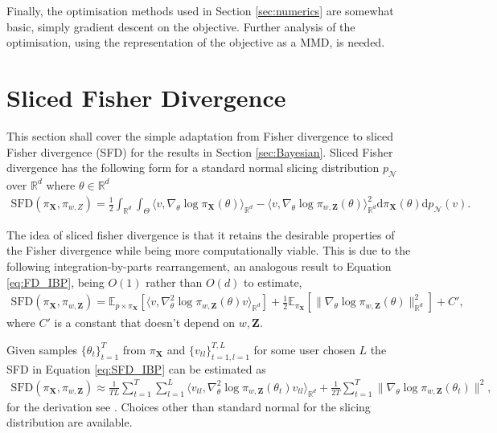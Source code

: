 \documentclass[hyperref]{article}
\theoremstyle{plain}
\theoremstyle{remark}
\newcommand{\bX}{\mathbf{X}}
\newcommand{\bZ}{\mathbf{Z}}
\newcommand{\bbR}{\mathbb{R}}
\newcommand{\bbE}{\mathbb{E}}
\begin{document}
Finally, the optimisation methods used in Section \ref{sec:numerics} are somewhat basic, simply gradient descent on the objective. Further analysis of the optimisation, using the representation of the objective as a MMD, is needed. 



\newpage
\appendix
\onecolumn
\section{Sliced Fisher Divergence}
This section shall cover the simple adaptation from Fisher divergence to sliced Fisher divergence (SFD) \citep{song2019sliced} for the results in Section \ref{sec:Bayesian}. Sliced Fisher divergence has the following form for a standard normal slicing distribution $p_{\mathcal{N}}$ over $\bbR^{d}$ where $\theta\in\bbR^{d}$
\begin{align}\label{eq:SFD}
	\text{SFD}(\pi_{\bX},\pi_{w,Z}) = \frac{1}{2}\int_{\bbR^{d}}\int_{\Theta}\langle v,\nabla_{\theta}\log\pi_{\bX}(\theta)\rangle_{\bbR^{d}} - \langle v,\nabla_{\theta}\log\pi_{w,\bZ}(\theta)\rangle_{\bbR^{d}}^{2}\mathrm{d}\pi_{\bX}(\theta)\mathrm{d}p_{\mathcal{N}}(v).
\end{align}

The idea of sliced fisher divergence is that it retains the desirable properties of the Fisher divergence while being more computationally viable. This is due to the following integration-by-parts rearrangement, an analogous result to Equation \eqref{eq:FD_IBP}, being $O(1)$ rather than $O(d)$ to estimate,
\begin{align}\label{eq:SFD_IBP}
	\text{SFD}(\pi_{\bX},\pi_{w,\bZ}) = \bbE_{p\times\pi_{\bX}}[\langle v,\nabla_{\theta}^{2}\log\pi_{w,\bZ}(\theta)v\rangle_{\bbR^{d}}] + \frac{1}{2}\bbE_{\pi_{\bX}}[\lVert \nabla_{\theta}\log\pi_{w,\bZ}(\theta)\rVert_{\bbR^{d}}^{2}] + C',
\end{align}
where $C'$ is a constant that doesn't depend on $w,\bZ$.

Given samples $\{\theta_{t}\}_{t=1}^{T}$ from $\pi_{\bX}$ and $\{v_{tl}\}_{t=1,l=1}^{T,L}$ for some user chosen $L$ the SFD in Equation \eqref{eq:SFD_IBP} can be estimated as
\begin{align}\label{eq:SFD_est}
	\text{SFD}(\pi_{\bX},\pi_{w,\bZ}) \approx \frac{1}{TL}\sum_{t=1}^{T}\sum_{l=1}^{L}\langle v_{tl},\nabla_{\theta}^{2}\log\pi_{w,\bZ}(\theta_{t})v_{tl}\rangle_{\bbR^{d}} + \frac{1}{2T}\sum_{t=1}^{T}\lVert\nabla_{\theta}\log\pi_{w,\bZ}(\theta_{t})\rVert^{2},
\end{align}
for the derivation see \citet{song2019sliced}. Choices other than standard normal for the slicing distribution are available.
\end{document}
